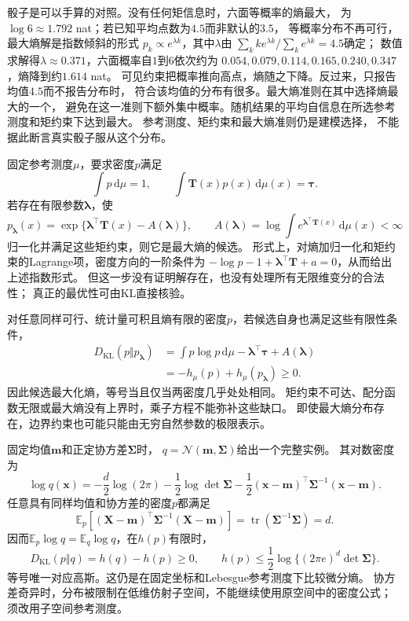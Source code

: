 骰子是可以手算的对照。没有任何矩信息时，六面等概率的熵最大，
为\(\log6\approx1.792\) nat；若已知平均点数为\(4.5\)而非默认的\(3.5\)，
等概率分布不再可行，最大熵解是指数倾斜的形式
\(p_k\propto e^{\lambda k}\)，其中\(\lambda\)由
\(\sum_kk e^{\lambda k}/\sum_k e^{\lambda k}=4.5\)确定；
数值求解得\(\lambda\approx0.371\)，六面概率自\(1\)到\(6\)依次约为
\(0.054,0.079,0.114,0.165,0.240,0.347\)，熵降到约\(1.614\) nat。
可见约束把概率推向高点，熵随之下降。反过来，只报告均值\(4.5\)而不报告分布时，
符合该均值的分布有很多。最大熵准则在其中选择熵最大的一个，
避免在这一准则下额外集中概率。随机结果的平均自信息在所选参考测度和矩约束下达到最大。
参考测度、矩约束和最大熵准则仍是建模选择，
不能据此断言真实骰子服从这个分布。

固定参考测度\(\mu\)，要求密度\(p\)满足
\[
  \int p\,\mathrm d\mu=1,\qquad
  \int \bm T(x)p(x)\,\mathrm d\mu(x)=\bm\tau.
\]
若存在有限参数\(\bm\lambda\)，使
\[
  p_{\bm\lambda}(x)
  =\exp\{\bm\lambda^\top\bm T(x)-A(\bm\lambda)\},\qquad
  A(\bm\lambda)=\log\int e^{\bm\lambda^\top\bm T(x)}\,\mathrm d\mu(x)<\infty
\]
归一化并满足这些矩约束，则它是最大熵的候选。
形式上，对熵加归一化和矩约束的Lagrange项，密度方向的一阶条件为
\(-\log p-1+\bm\lambda^\top\bm T+a=0\)，从而给出上述指数形式。
但这一步没有证明解存在，也没有处理所有无限维变分的合法性；
真正的最优性可由KL直接核验。

对任意同样可行、统计量可积且熵有限的密度\(p\)，若候选自身也满足这些有限性条件，
\[
\begin{aligned}
  D_{\mathrm{KL}}(p\Vert p_{\bm\lambda})
  &=\int p\log p\,\mathrm d\mu-\bm\lambda^\top\bm\tau+A(\bm\lambda)\\
  &=-h_\mu(p)+h_\mu(p_{\bm\lambda})\geq0.
\end{aligned}
\]
因此候选最大化熵，等号当且仅当两密度几乎处处相同。
矩约束不可达、配分函数无限或最大熵没有上界时，乘子方程不能弥补这些缺口。
即使最大熵分布存在，边界约束也可能只能由无穷自然参数的极限表示。

固定均值\(\bm m\)和正定协方差\(\bm\Sigma\)时，
\(q=\mathcal N(\bm m,\bm\Sigma)\)给出一个完整实例。
其对数密度为
\[
  \log q(\bm x)
  =-\frac d2\log(2\pi)-\frac12\log\det\bm\Sigma
   -\frac12(\bm x-\bm m)^\top\bm\Sigma^{-1}(\bm x-\bm m).
\]
任意具有同样均值和协方差的密度\(p\)都满足
\[
  \mathbb E_p[(\bm X-\bm m)^\top\bm\Sigma^{-1}(\bm X-\bm m)]
  =\operatorname{tr}(\bm\Sigma^{-1}\bm\Sigma)=d.
\]
因而\(\mathbb E_p\log q=\mathbb E_q\log q\)，在\(h(p)\)有限时，
\[
  D_{\mathrm{KL}}(p\Vert q)=h(q)-h(p)\geq0,\qquad
  h(p)\leq\frac12\log\{(2\pi e)^d\det\bm\Sigma\}.
\]
等号唯一对应高斯。这仍是在固定坐标和Lebesgue参考测度下比较微分熵。
协方差奇异时，分布被限制在低维仿射子空间，不能继续使用原空间中的密度公式；
须改用子空间参考测度。

